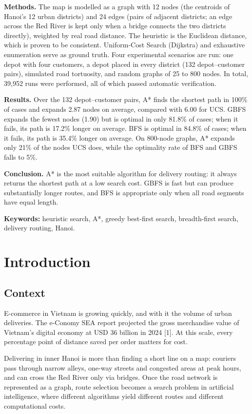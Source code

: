 \documentclass[12pt,a4paper]{article}
\begin{document}
\textbf{Methods.} The map is modelled as a graph with 12
nodes (the centroids of Hanoi's 12 urban districts) and 24
edges (pairs of adjacent districts; an edge across the Red
River is kept only when a bridge connects the two districts
directly), weighted by real road distance. The heuristic is
the Euclidean distance, which is proven to be consistent.
Uniform-Cost Search (Dijkstra) and exhaustive enumeration
serve as ground truth. Four experimental scenarios are run:
one depot with four customers, a depot placed in every
district (132 depot--customer pairs), simulated road
tortuosity, and random graphs of 25 to 800 nodes. In total,
39,952 runs were performed, all of which passed automatic
verification.

\textbf{Results.} Over the 132 depot--customer pairs, A*
finds the shortest path in 100\% of cases and expands 2.87
nodes on average, compared with 6.00 for UCS. GBFS expands
the fewest nodes (1.90) but is optimal in only 81.8\% of
cases; when it fails, its path is 17.2\% longer on average.
BFS is optimal in 84.8\% of cases; when it fails, its path
is 35.4\% longer on average. On 800-node graphs, A* expands
only 21\% of the nodes UCS does, while the optimality rate
of BFS and GBFS falls to 5\%.

\textbf{Conclusion.} A* is the most suitable algorithm for
delivery routing: it always returns the shortest path at a
low search cost. GBFS is fast but can produce substantially
longer routes, and BFS is appropriate only when all road
segments have equal length.

\textbf{Keywords:} heuristic search, A*, greedy best-first
search, breadth-first search, delivery routing, Hanoi.

\newpage
\section{Introduction}

\subsection{Context}

E-commerce in Vietnam is growing quickly, and with it the
volume of urban deliveries. The e-Conomy SEA report
projected the gross merchandise value of Vietnam's digital
economy at USD 36 billion in 2024 {[}1{]}. At this scale,
every percentage point of distance saved per order matters
for cost.

Delivering in inner Hanoi is more than finding a short line
on a map: couriers pass through narrow alleys, one-way
streets and congested areas at peak hours, and can cross the
Red River only via bridges. Once the road network is
represented as a graph, route selection becomes a search
problem in artificial intelligence, where different
algorithms yield different routes and different
computational costs.
\end{document}
